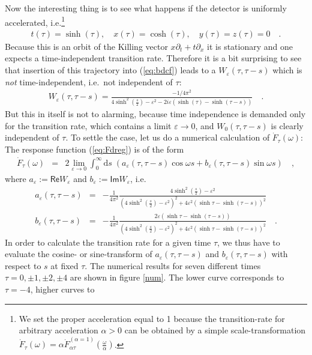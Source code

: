 \documentclass[a4paper,12pt]{article}
\renewcommand{\Im}{\mathsf{Im}}
\renewcommand{\Re}{\mathsf{Re}}
\newcommand{\eps}{\varepsilon}
\newcommand{\Fd}{\dot F_{\tau}(\omega)}
\newcommand{\lime}{\lim_{\eps\to0}}
\renewcommand{\d}{\mathrm{d}}
\begin{document}
\bigskip

Now the interesting thing is to see what happens if the detector is uniformly accelerated,
i.e.\footnote{We set the proper acceleration equal to 1 because the transition-rate for
arbitrary acceleration $\alpha>0$ can be obtained by a simple scale-transformation 
$\Fd=\alpha\dot{F}_{\alpha\tau}^{(\alpha=1)}\left(\frac{\omega}{\alpha}\right)$.}
\begin{eqnarray*}
t(\tau)=\sinh(\tau),\quad x(\tau)=\cosh(\tau),\quad
y(\tau)=z(\tau)=0\quad.
\end{eqnarray*}
Because this is an orbit of the Killing vector $x\partial_t+t\partial_x$ it is stationary
and one expects a time-independent transition rate. Therefore it is a bit surprising 
to see that insertion of this trajectory into (\ref{eq:bdcf}) leads to a $W_\eps(\tau,\tau-s)$ 
which is {\em not} time-independent, i.e.\ not independent of $\tau$:
\begin{eqnarray*}
W_\eps(\tau,\tau-s)=\frac{-1/4\pi^2}{4\sinh^2\left(\frac{s}{2}\right)
-\eps^2-2i\eps\left(\sinh(\tau)-\sinh(\tau-s)\right)}\quad.
\end{eqnarray*}
But this in itself is not to alarming, because time independence is demanded only for
the transition rate, which contains a limit $\eps\to 0$, and $W_0(\tau,\tau-s)$ 
is clearly independent of $\tau$. To settle the case, let us do a numerical calculation
of $\Fd$:
The response function (\ref{eq:Fdreg}) is of the form
\begin{eqnarray*}
\Fd&=&2\lime\int_0^\infty\d s\;\left(a_\eps(\tau,\tau-s)\cos\omega s + 
b_\eps(\tau,\tau-s)\sin\omega s\right)\quad,
\end{eqnarray*}
where $a_\eps:=\Re W_\eps$ and $b_\eps:=\Im W_\eps$, i.e.
\begin{eqnarray*}
a_{\eps}(\tau,\tau-s)&=&-\frac{1}{4\pi^2}\frac{4\sinh^2(\frac{s}{2})-
\eps^2}{\left(4\sinh^2(\frac{s}{2})-\eps^2\right)^2+
4\eps^2(\sinh\tau-\sinh(\tau-s))^2}\\
b_{\eps}(\tau,\tau-s)&=&-\frac{1}{4\pi^2}\frac{2\eps(\sinh\tau-
\sinh(\tau-s))}{\left(4\sinh^2(\frac{s}{2})-\eps^2\right)^2+
4\eps^2(\sinh\tau-\sinh(\tau-s))^2}\quad.
\end{eqnarray*}
In order to calculate the transition rate for a given time $\tau$, we thus have to 
evaluate the cosine- or sine-transform of $a_\eps(\tau,\tau-s)$ and $b_\eps(\tau,\tau-s)$
with respect to $s$ at fixed $\tau$. 
The numerical results for seven different times $\tau=0,\pm1,\pm2,\pm4$ are shown in 
figure 
\ref{num}. The lower curve corresponds to $\tau=-4$, higher curves to 
\end{document}
